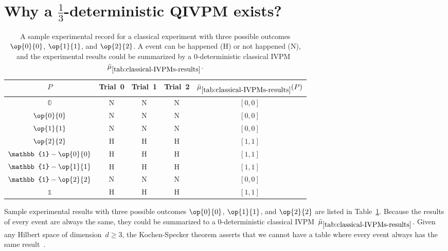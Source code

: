 \documentclass[english,reprint, aps, prl,superscriptaddress, showpacs,
showkeys, longbibliography, amsmath, amssymb, floatfix]{revtex4-1}
\theoremstyle{plain}
\theoremstyle{definition}
\newcommand{\imposs}{\ensuremath{\left[0,0\right]}}
\newcommand{\necess}{\ensuremath{\left[1,1\right]}}
\newcommand{\proj}[1]{\op{#1}{#1}}
\newcommand{\happen}{\text{H}}
\newcommand{\notHappen}{\text{N}}
\begin{document}
\section{Why a \texorpdfstring{$\frac{1}{3}$}{⅓}-deterministic QIVPM exists?}

\begin{table}
\noindent \centering{}\caption{\label{tab:classical-IVPMs-results}A sample experimental record for
a classical experiment with three possible outcomes $\proj{0}$, $\proj{1}$,
and $\proj{2}$. A event can be happened ($\happen$) or not happened
($\notHappen$), and the experimental results could be summarized
by a $0$-deterministic classical IVPM~$\bar{\mu}_{\ref{tab:classical-IVPMs-results}}$.}
\begin{tabular}{ccccc}
\toprule 
\addlinespace
$P$  & Trial~0 & Trial~1 & Trial~2 & $\bar{\mu}_{\ref{tab:classical-IVPMs-results}}(P)$\tabularnewline
\midrule
\midrule 
\addlinespace
$\mathbb{0}$  & $\notHappen$ & $\notHappen$ & $\notHappen$ & $\imposs$\tabularnewline
\midrule 
\addlinespace
$\proj{0}$  & $\notHappen$ & $\notHappen$ & $\notHappen$ & $\imposs$\tabularnewline
\midrule 
\addlinespace
$\proj{1}$  & $\notHappen$ & $\notHappen$ & $\notHappen$ & $\imposs$\tabularnewline
\midrule 
\addlinespace
$\proj{2}$ & $\happen$ & $\happen$ & $\happen$ & $\necess$\tabularnewline
\midrule 
\addlinespace
$\mathbb{1}-\proj{0}$  & $\happen$ & $\happen$ & $\happen$ & $\necess$\tabularnewline
\midrule 
\addlinespace
$\mathbb{1}-\proj{1}$  & $\happen$ & $\happen$ & $\happen$ & $\necess$\tabularnewline
\midrule 
\addlinespace
$\mathbb{1}-\proj{2}$ & $\notHappen$ & $\notHappen$ & $\notHappen$ & $\imposs$\tabularnewline
\midrule 
\addlinespace
$\mathbb{1}$  & $\happen$ & $\happen$ & $\happen$ & $\necess$\tabularnewline
\bottomrule
\end{tabular}
\end{table}
Sample experimental results with three possible outcomes $\proj{0}$,
$\proj{1}$, and $\proj{2}$ are listed in Table~\ref{tab:classical-IVPMs-results}.
Because the results of every event are always the same, they could
be summarized to a $0$-deterministic classical IVPM~$\bar{\mu}_{\ref{tab:classical-IVPMs-results}}$.
Given any Hilbert space of dimension~$d\ge3$, the Kochen-Specker
theorem asserts that we cannot have a table where every event always
has the same result~\cite{THOS2017}. 
\end{document}
